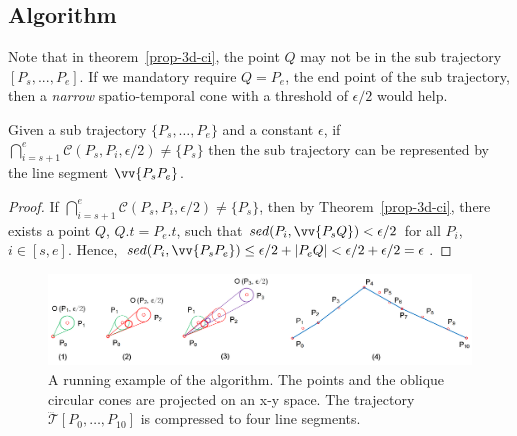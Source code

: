 \subsection{{Algorithm \cist}}

Note that in theorem~\ref{prop-3d-ci}, the point $Q$ may not be in the sub trajectory $[P_s,...,P_e]$. If we mandatory require $Q=P_e$, the end point of the sub trajectory, then a \emph{narrow} spatio-temporal cone with a threshold of $\epsilon/2$ would help.

\begin{cor}
\label{prop-3d-ci-half}
Given a sub trajectory $\{P_s, \ldots, P_e\}$ and a constant $\epsilon$, if $\bigcap_{i=s+1}^{e}{\mathcal{C}(P_s, P_i, \epsilon/2)} \ne \{P_s\}$ then the sub trajectory can be represented by the line segment $\vv{P_sP_e}$.
\end{cor}

\begin{proof}
If $\bigcap_{i=s+1}^{e}{\mathcal{C}(P_s, P_i, \epsilon/2)} \ne \{P_s\}$, then by Theorem~\ref{prop-3d-ci}, there exists a point $Q$, $Q.t = P_e.t$, such that $sed(P_i, \vv{P_sQ})<\epsilon/2$ for all $P_i$, $i \in [s,e]$. Hence, $sed(P_i, \vv{P_sP_e})\le \epsilon/2 + |P_eQ| < \epsilon/2 + \epsilon/2 = \epsilon$.
\end{proof}


\begin{figure}[tb!]
\centering
\includegraphics[scale=0.8]{figures/Fig-ex-conest.png}
\vspace{-1ex}
\caption{\small A running example of the \cist algorithm. The points and the oblique circular cones are projected on an x-y space. The trajectory $\dddot{\mathcal{T}}[P_0, \ldots, P_{10}]$ is compressed to four line segments.}
\vspace{-2ex}
\label{fig:exm-const}
\end{figure}



